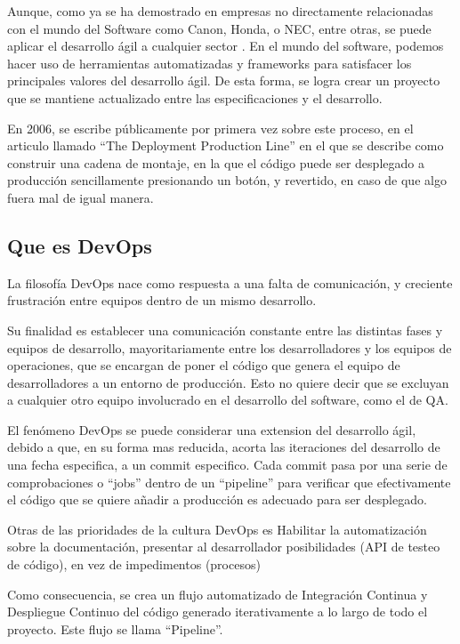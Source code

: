 \documentclass[12pt]{report} %
\begin{document}
Aunque, como ya se ha demostrado en empresas no directamente relacionadas con el
mundo del Software como Canon, Honda, o NEC, entre otras, se puede aplicar el
desarrollo ágil a cualquier sector \cite{Hirotaka1986}.  En el mundo del
software, podemos hacer uso de herramientas automatizadas y frameworks para
satisfacer los principales valores del desarrollo ágil.  De esta forma, se logra
crear un proyecto que se mantiene actualizado entre las especificaciones y el
desarrollo.

En 2006, se escribe públicamente por primera vez sobre este proceso, en el
articulo llamado ``The Deployment Production Line'' en el que se describe como
construir una cadena de montaje, en la que el código puede ser desplegado a
producción sencillamente presionando un botón, y revertido, en caso de que algo
fuera mal de igual manera. \cite{10.1109/AGILE.2006.53}

\subsection{Que es DevOps}


La filosofía DevOps nace como respuesta a una falta de comunicación, y creciente
frustración entre equipos dentro de un mismo desarrollo.

Su finalidad es establecer una comunicación constante entre las distintas fases
y equipos de desarrollo, mayoritariamente entre los desarrolladores y los
equipos de operaciones, que se encargan de poner el código que genera el equipo
de desarrolladores a un entorno de producción. Esto no quiere decir que se
excluyan a cualquier otro equipo involucrado en el desarrollo del software, como
el de QA.

El fenómeno DevOps se puede considerar una extension del desarrollo ágil, debido
a que, en su forma mas reducida, acorta las iteraciones del desarrollo de una
fecha especifica, a un commit especifico. \cite{dobra2018} Cada commit pasa por
una serie de comprobaciones o ``jobs'' dentro de un ``pipeline'' para verificar
que efectivamente el código que se quiere añadir a producción es adecuado para
ser desplegado.

Otras de las prioridades de la cultura DevOps es Habilitar la automatización
sobre la documentación, presentar al desarrollador posibilidades (API de testeo
de código), en vez de impedimentos (procesos)

Como consecuencia, se crea un flujo automatizado de Integración Continua y
Despliegue Continuo del código generado iterativamente a lo largo de todo el
proyecto. Este flujo se llama ``Pipeline''.
\end{document}
